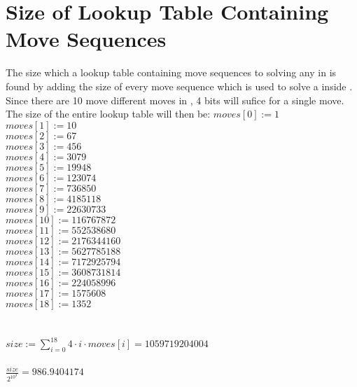 \chapter{Size of Lookup Table Containing Move Sequences}
\label{chap:sizeOfLookUp}
The size which a lookup table containing move sequences to solving any \cube{} in  is found by adding the size of every move sequence which is used to solve a \cube{} inside .
Since there are 10 move different moves in , 4 bits will sufice for a single move.
The size of the entire lookup table will then be:
$moves[0] := 1$ \\
$moves[1] := 10$ \\
$moves[2] := 67$ \\
$moves[3] := 456$ \\
$moves[4] := 3079$ \\
$moves[5] := 19948$ \\
$moves[6] := 123074$ \\
$moves[7] := 736850$ \\
$moves[8] := 4185118$ \\
$moves[9] := 22630733$ \\
$moves[10] := 116767872$ \\
$moves[11] := 552538680$ \\
$moves[12] := 2176344160$ \\
$moves[13] := 5627785188$ \\
$moves[14] := 7172925794$ \\
$moves[15] := 3608731814$ \\
$moves[16] := 224058996$ \\
$moves[17] := 1575608$ \\
$moves[18] := 1352$ \\
\\ \\
$size := \sum_{i=0}^{18} 4 \cdot i \cdot moves[i] = 1059719204004$
\\ \\
$\frac{size}{2^{10^3}} = 986.9404174$
